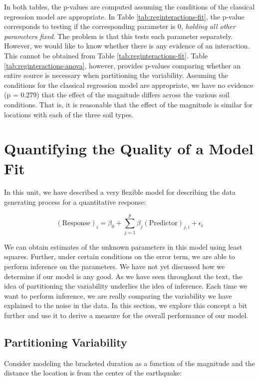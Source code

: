 \documentclass[]{book}
\theoremstyle{definition}
\theoremstyle{definition}
\theoremstyle{definition}
\theoremstyle{remark}
\begin{document}
In both tables, the p-values are computed assuming the conditions of the
classical regression model are appropriate. In Table
\ref{tab:reginteractions-fit}, the p-value corresponds to testing if the
corresponding parameter is 0, \emph{holding all other parameters fixed}.
The problem is that this tests each parameter separately. However, we
would like to know whether there is any evidence of an interaction. This
cannot be obtained from Table \ref{tab:reginteractions-fit}. Table
\ref{tab:reginteractions-anova}, however, provides p-values comparing
whether an entire source is necessary when partitioning the variability.
Assuming the conditions for the classical regression model are
appropriate, we have no evidence (p = 0.279) that the effect of the
magnitude differs across the various soil conditions. That is, it is
reasonable that the effect of the magnitude is similar for locations
with each of the three soil types.

\chapter{Quantifying the Quality of a Model Fit}\label{Regquality}

In this unit, we have described a very flexible model for describing the
data generating process for a quantitative response:

\[(\text{Response})_i = \beta_0 + \sum_{j=1}^{p} \beta_j (\text{Predictor})_{j,i} + \epsilon_i\]

We can obtain estimates of the unknown parameters in this model using
least squares. Further, under certain conditions on the error term, we
are able to perform inference on the parameters. We have not yet
discussed how we determine if our model is any good. As we have seen
throughout the text, the idea of partitioning the variability underlies
the idea of inference. Each time we want to perform inference, we are
really comparing the variability we have explained to the noise in the
data. In this section, we explore this concept a bit further and use it
to derive a measure for the overall performance of our model.

\section{Partitioning Variability}\label{partitioning-variability-1}

Consider modeling the bracketed duration as a function of the magnitude
and the distance the location is from the center of the earthquake:
\end{document}
